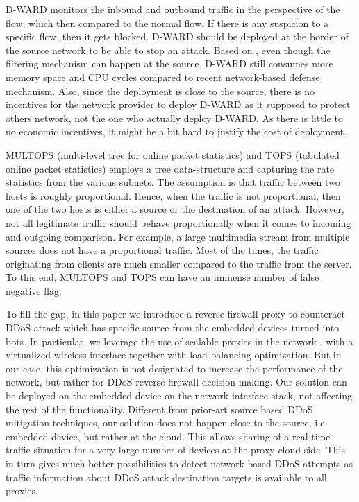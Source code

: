 \documentclass[sigplan,screen]{acmart}
\begin{document}
D-WARD \cite{1510618} monitors the inbound and outbound traffic in the perspective of the flow, which then compared to the normal flow. If there is any suspicion to a specific flow, then it gets blocked. D-WARD should be deployed at the border of the source network to be able to stop an attack. Based on \cite{6489876}, even though the filtering mechanism can happen at the source, D-WARD still consumes more memory space and CPU cycles compared to recent network-based defense mechanism. Also, since the deployment is close to the source, there is no incentives for the network provider to deploy D-WARD as it supposed to protect others network, not the one who actually deploy D-WARD. As there is little to no economic incentives, it might be a bit hard to justify the cost of deployment.

MULTOPS (multi-level tree for online packet statistics) and TOPS (tabulated online packet statistics) \cite{10.5555/1251327.1251330} employs a tree data-structure and capturing the rate statistics from the various subnets. The assumption is that traffic between two hosts is roughly proportional. Hence, when the traffic is not proportional, then one of the two hosts is either a source or the destination of an attack. However, not all legitimate traffic should behave proportionally when it comes to incoming and outgoing comparison. For example, a large multimedia stream from multiple sources does not have a proportional traffic. Most of the times, the traffic originating from clients are much smaller compared to the traffic from the server. To this end, MULTOPS and TOPS can have an immense number of false negative flag.

To fill the gap, in this paper we introduce a reverse firewall proxy to counteract DDoS attack which has specific source from the embedded devices turned into bots. In particular, we leverage the use of scalable proxies in the network \cite{7860486}, with a virtualized wireless interface \cite{10.1007/978-3-642-29154-8_20} together with load balancing optimization. But in our case, this optimization is not designated to increase the performance of the network, but rather for DDoS reverse firewall decision making. Our solution can be deployed on the embedded device on the network interface stack, not affecting the rest of the functionality. Different from prior-art source based DDoS mitigation techniques, our solution does not happen close to the source, i.e. embedded device, but rather at the cloud. This allows sharing of a real-time traffic situation for a very large number of devices at the proxy cloud side. This in turn gives much better possibilities to detect network based DDoS attempts as traffic information about DDoS attack destination targets is available to all proxies.
\end{document}
